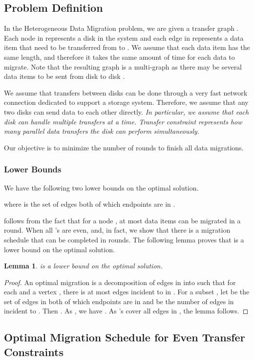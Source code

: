 \documentclass[titlepage, 11pt]{article}
\newtheorem{lemma}[theorem]{Lemma}
\begin{document}
\subsection{Problem Definition}
In the {\sc Heterogeneous Data Migration} problem, 
we are given a transfer graph .
Each node in  represents a disk in the system
and each edge  in  represents
a data item that need to be transferred from  to .
We assume that each data item has the same length, and therefore
it takes the same amount of time for each data to migrate.
Note that the resulting graph is a multi-graph as
there may be several data items to be sent from disk  to disk .

We assume that transfers between disks can be done through 
a very fast network connection dedicated to support a storage system.
Therefore, we assume that any two disks can send data to each other directly.
{\em In particular, we assume that each disk  can handle multiple transfers
at a time. Transfer constraint  represents 
how many parallel data transfers the disk  can perform
simultaneously}.

Our objective is to minimize the number of rounds
to finish all data migrations.

\subsubsection{Lower Bounds}
We have the following two lower bounds on the optimal solution.

where  is the set of edges both of which endpoints
are in .

 follows from the fact that for a node , at most  data items can be migrated
in a round.  When all 's are even,  and, 
in fact, we show that there is a migration schedule that can be
completed in  rounds.
The following lemma proves that  is a lower bound on the optimal
solution.
\begin{lemma}
 is a lower bound on the optimal solution.
\end{lemma}
\begin{proof}
An optimal migration is a decomposition of edges in  into 
 such that for each  and a vertex ,
there is at most  edges incident to  in .
For a subset , let  be
the set of edges in  both of which endpoints are in 
and  be the number of edges in  incident to .
Then .
As , we have .
As 's cover all edges in , the lemma follows.
\end{proof}


\subsection{Optimal Migration Schedule for Even Transfer Constraints}
\end{document}
